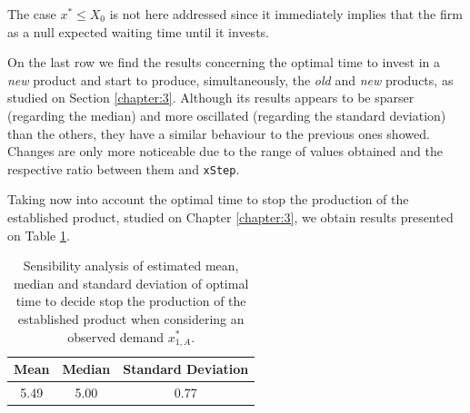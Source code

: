 The case $x^*\leq X_0$ is not here addressed since it immediately implies that the firm as a null expected waiting time until it invests.





On the last row we find the results concerning the optimal time to invest in a \textit{new} product and start to produce, simultaneously, the \textit{old} and \textit{new} products, as studied on Section \ref{chapter:3}. Although its results appears to be sparser (regarding the median) and more oscillated (regarding the standard deviation) than the others, they have a similar behaviour to the previous ones showed. Changes are only more noticeable due to the range of values obtained and the respective ratio between them and \texttt{xStep}.


Taking now into account the optimal time to stop the production of the established product, studied on Chapter \ref{chapter:3}, we obtain results presented on Table \ref{stoptime_t}.
\begin{table}[!htb]
	\caption{Sensibility analysis of estimated mean, median and standard deviation of optimal time to decide stop the production of the established product when considering an observed demand $x_{1,A}^*$.}
	\centering
	\begin{tabular}{ccc}
		Mean & Median & Standard Deviation \\ \hline
		5.49 & 5.00 & 0.77
	\end{tabular}
\label{stoptime_t}
\end{table}

